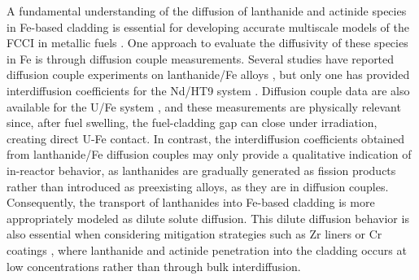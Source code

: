\documentclass[preprint,12pt]{elsarticle}
\begin{document}
A fundamental understanding of the diffusion of lanthanide and actinide species in Fe-based cladding is essential for developing accurate multiscale models of the FCCI in metallic fuels \cite{aagesen_jr_physics-based_2022, aagesen_mechanistic_2023}. One approach to evaluate the diffusivity of these species in Fe is through diffusion couple measurements. Several studies have reported diffusion couple experiments on lanthanide/Fe alloys \cite{INAGAKI2013574, JERRED2020152387, helmreich_diffusion_2014}, but only one has provided interdiffusion coefficients for the Nd/HT9 system \cite{helmreich_diffusion_2014}. Diffusion couple data are also available for the U/Fe system \cite{huang2012interdiffusion, chen2015intermetallic}, and these measurements are physically relevant since, after fuel swelling, the fuel-cladding gap can close under irradiation, creating direct U-Fe contact. In contrast, the interdiffusion coefficients obtained from lanthanide/Fe diffusion couples may only provide a qualitative indication of in-reactor behavior, as lanthanides are gradually generated as fission products rather than introduced as preexisting alloys, as they are in diffusion couples. Consequently, the transport of lanthanides into Fe-based cladding is more appropriately modeled as dilute solute diffusion. This dilute diffusion behavior is also essential when considering mitigation strategies such as Zr liners or Cr coatings \cite{ryu_performance_2009, kim_performance_2009, jee_improvement_2013, OH2024113102}, where lanthanide and actinide penetration into the cladding occurs at low concentrations rather than through bulk interdiffusion.
\end{document}
